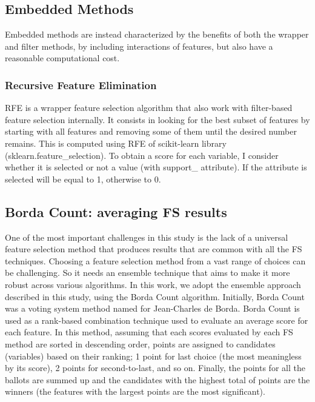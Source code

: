 \subsection{Embedded Methods}
Embedded methods are instead characterized by the benefits of both the wrapper and filter methods, by including interactions of features, but also have a reasonable computational cost.\par
\bigskip
\subsubsection{Recursive Feature Elimination}
RFE is a wrapper feature selection algorithm that also work with filter-based feature selection internally.\newline
It consists in looking for the best subset of features by starting with all features and removing some of them until the desired number remains.\newline
This is computed using RFE of scikit-learn library (sklearn.feature\_selection).
To obtain a score for each variable, I consider whether it is selected or not a value (with support\_ attribute).
If the attribute is selected will be equal to 1, otherwise to 0.
\pagebreak
\subsection{Borda Count: averaging FS results}
One of the most important challenges in this study is the lack of a universal feature selection method that produces results that are common with all the FS techniques. Choosing a feature selection method from a vast range of choices can be challenging. \newline
So it needs an ensemble technique that aims to make it more robust across various algorithms. In this work, we adopt the ensemble approach described in this study\cite{sarkar2014robust}, using the Borda Count algorithm. Initially, Borda Count was a voting system method named for Jean-Charles de Borda\cite{borda1784memoire}.\newline
Borda Count is used as a rank-based combination technique used to evaluate an average score for each feature. In this method, assuming that each scores evaluated by each FS method are sorted in descending order, points are assigned to candidates (variables) based on their ranking; 1 point for last choice (the most meaningless by its score), 2 points for second-to-last, and so on. Finally, the points for all the ballots are summed up and the candidates with the highest total of points are the winners (the features with the largest points are the most significant).
\par


